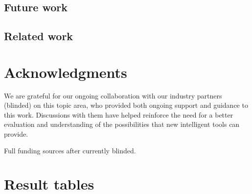 \documentclass[sigconf,anonymous]{acmart}\usepackage[]{graphicx}\usepackage[]{color}
\begin{document}
\subsection{Future work}

\subsection{Related work}

\section{Acknowledgments}

We are grateful for our ongoing collaboration with our industry partners (blinded) on this topic area, who provided both ongoing support and guidance to this work. Discussions with them have helped reinforce the need for a better evaluation and understanding of the possibilities that new intelligent tools can provide.

Full funding sources after currently blinded.


  


\appendix

\section{Result tables}





 
\end{document}
